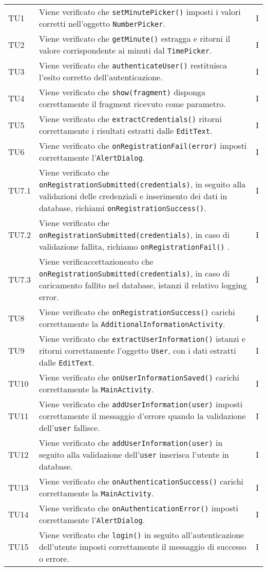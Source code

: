 \begin{longtable}{ >{\centering}p{}  >{\centering}p{} >{\centering}p{}
			}
		TU1 & Viene verificato che \texttt{setMinutePicker()} imposti i valori corretti nell'oggetto \texttt{NumberPicker}. & I  \tabularnewline		
		TU2 & Viene verificato che \texttt{getMinute()} estragga e ritorni il valore corrispondente ai minuti dal \texttt{TimePicker}. & I \tabularnewline	
		TU3 & Viene verificato che \texttt{authenticateUser()} restituisca l'esito corretto dell'autenticazione. & I 
		\tabularnewline	
		TU4 & Viene verificato che \texttt{show(fragment)} disponga correttamente il fragment ricevuto come parametro. & I 
		\tabularnewline	
		TU5 & Viene verificato che \texttt{extractCredentials()} ritorni correttamente i risultati estratti dalle \texttt{EditText}. & I \tabularnewline	
		TU6 & Viene verificato che \texttt{onRegistrationFail(error)} imposti correttamente l'\texttt{AlertDialog}. & I
		\tabularnewline	
		TU7.1 & Viene verificato che \texttt{onRegistrationSubmitted(credentials)}, in seguito alla validazioni delle credenziali e inserimento dei dati in database, richiami \texttt{onRegistrationSuccess()}. & I 
		\tabularnewline	
		TU7.2 & Viene verificato che \texttt{onRegistrationSubmitted(credentials)}, in caso di validazione fallita, richiamo \texttt{onRegistrationFail()} . & I 
		\tabularnewline	
		TU7.3 & Viene verificaccettazioneato che \texttt{onRegistrationSubmitted(credentials)}, in caso di caricamento fallito nel database, istanzi il relativo logging error. & I 
		\tabularnewline	
		TU8 & Viene verificato che \texttt{onRegistrationSuccess()} carichi correttamente la \texttt{AdditionalInformationActivity}. & I 
		\tabularnewline	
		TU9 & Viene verificato che \texttt{extractUserInformation()} istanzi e ritorni correttamente l'oggetto \texttt{User}, con i dati estratti dalle \texttt{EditText}. & I 
		\tabularnewline	
		TU10 & Viene verificato che \texttt{onUserInformationSaved()} carichi correttamente la \texttt{MainActivity}. & I 
				\tabularnewline	
		TU11 & Viene verificato che \texttt{addUserInformation(user)} imposti correttamente il messaggio d'errore quando la validazione dell'\texttt{user} fallisce. & I 
		\tabularnewline	
		TU12 & Viene verificato che \texttt{addUserInformation(user)} in seguito alla validazione dell'\texttt{user} inserisca l'utente in database. & I
		\tabularnewline	
		TU13 & Viene verificato che \texttt{onAuthenticationSuccess()} carichi correttamente la \texttt{MainActivity}. & I 
		\tabularnewline	
		TU14 & Viene verificato che \texttt{onAuthenticationError()} imposti correttamente l'\texttt{AlertDialog}. & I 
		\tabularnewline	
		TU15 & Viene verificato che \texttt{login()} in seguito all'autenticazione dell'utente imposti correttamente il messaggio di successo o errore. & I

\end{longtable}

